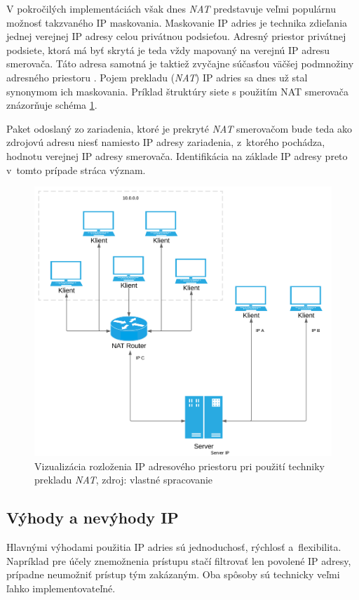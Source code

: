 \documentclass[
  digital, %
  oneside, %
  table,   %
  lof,     %
  nolot,   %
  nocover
]{fithesis3}
\begin{document}
V pokročilých
implementáciách však dnes \textit{NAT} predstavuje veľmi populárnu možnosť
takzvaného  IP maskovania. Maskovanie IP adries je technika zdieľania jednej
verejnej IP adresy celou privátnou podsieťou. Adresný priestor privátnej
podsiete, ktorá má byť skrytá je teda vždy mapovaný na verejnú IP adresu
smerovača. Táto adresa samotná je taktiež zvyčajne súčasťou väčšej podmnožiny
adresného priestoru \cite{Huston:NAT}. Pojem prekladu (\textit{NAT}) IP adries sa dnes už stal
synonymom ich maskovania. Príklad štruktúry siete s použitím NAT smerovača znázorňuje
schéma \ref{fig:tech-IP-NAT}.

Paket odoslaný zo zariadenia, ktoré je prekryté
\textit{NAT} smerovačom bude teda ako zdrojovú adresu niesť namiesto IP adresy
zariadenia, z~ktorého pochádza, hodnotu verejnej IP adresy smerovača.
Identifikácia na základe IP adresy preto v~tomto prípade stráca význam.

\begin{figure}[H]
  \centering
    \includegraphics[width=.93\textwidth]{images/tech-IP-NAT.png}
  \caption{Vizualizácia rozloženia IP adresového priestoru pri použití techniky
  prekladu \textit{NAT}, zdroj: vlastné spracovanie}
  \label{fig:tech-IP-NAT}
\end{figure}

\subsection{Výhody a nevýhody IP}
Hlavnými výhodami použitia IP adries sú jednoduchosť, rýchlosť a~flexibilita.
Napríklad pre účely znemožnenia prístupu stačí filtrovať len povolené IP
adresy, prípadne neumožniť prístup tým zakázaným. Oba spôsoby sú technicky veľmi
ľahko implementovateľné.
\end{document}
